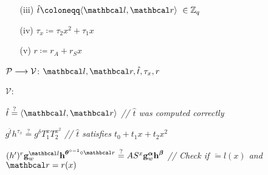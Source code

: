 \begin{mdframed}
\begin{itemize}[itemsep=4pt]
\begin{enumerate}[itemsep=5pt]
        \item[(iii)] $\hat{t} \coloneqq \langle \lvec, \rvec \rangle \ \in \Z_q$
        
        \item[(iv)] $\tau_x \coloneqq \tau_2x^2 + \tau_1x$
        
        \item[(v)] $r \coloneqq r_A + r_Sx$
        
    \end{enumerate}
    
    \item[] $\mathcal{P} \longrightarrow \mathcal{V}$: $\lvec, \rvec, \hat{t}, \tau_x, r$
    
    \item[] $\mathcal{V}$: 
    \begin{enumerate}[itemsep=5pt]
        $\hat{t} \stackrel{?}{=} \langle \lvec, \rvec \rangle$ \hfill{{\small \textit{// $\hat{t}$ was computed correctly}}}

        $g^{\hat{t}}h^{\tau_x} \stackrel{?}{=} g^{\delta} T_1^{x} T_2^{x^2}$ \hfill{{\small \textit{// $\hat{t}$ satisfies $t_0 + t_1x + t_2x^2$}}} 

        $(h^{\prime})^{r} \textbf{g}^{\lvec}_w \textbf{h}^{\vecnb{\theta}^{\circ -1} \circ \rvec} \stackrel{?}{=} AS^{x} \textbf{g}^{\vecnb{\alpha}}_w \textbf{h}^{\vecnb{\beta}}$ \hfill{{\small \textit{// Check if $\lvec = l(x)$ and $\rvec = r(x)$}}}
        
    \end{enumerate}
  
  \end{itemize}
\end{mdframed}

